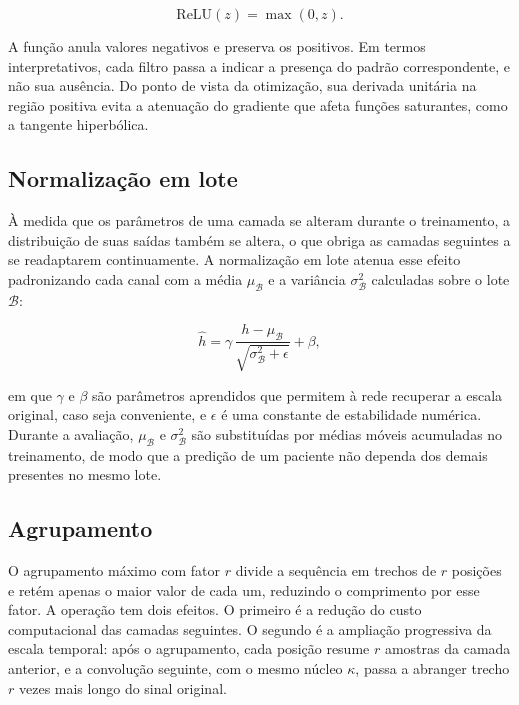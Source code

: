 \begin{equation}
	\mathrm{ReLU}(z) = \max(0, z).
	\label{eq:relu}
\end{equation}

A função anula valores negativos e preserva os positivos. Em termos
interpretativos, cada filtro passa a indicar a presença do padrão
correspondente, e não sua ausência. Do ponto de vista da otimização, sua
derivada unitária na região positiva evita a atenuação do gradiente que
afeta funções saturantes, como a tangente hiperbólica.

\subsection{Normalização em lote}
\label{subsec:fund-batchnorm}

À medida que os parâmetros de uma camada se alteram durante o treinamento, a
distribuição de suas saídas também se altera, o que obriga as camadas
seguintes a se readaptarem continuamente. A normalização em lote
\cite{ioffe2015batch} atenua esse efeito padronizando cada canal com a
média $\mu_{\mathcal{B}}$ e a variância $\sigma^{2}_{\mathcal{B}}$
calculadas sobre o lote $\mathcal{B}$:

\begin{equation}
	\hat{h} = \gamma \, \frac{h - \mu_{\mathcal{B}}}
	{\sqrt{\sigma^{2}_{\mathcal{B}} + \epsilon}} + \beta,
	\label{eq:batchnorm}
\end{equation}

\noindent
em que $\gamma$ e $\beta$ são parâmetros aprendidos que permitem à rede
recuperar a escala original, caso seja conveniente, e $\epsilon$ é uma
constante de estabilidade numérica. Durante a avaliação, $\mu_{\mathcal{B}}$
e $\sigma^{2}_{\mathcal{B}}$ são substituídas por médias móveis acumuladas no
treinamento, de modo que a predição de um paciente não dependa dos demais
presentes no mesmo lote.

\subsection{Agrupamento}
\label{subsec:fund-pooling}

O agrupamento máximo com fator $r$ divide a sequência em trechos de $r$
posições e retém apenas o maior valor de cada um, reduzindo o comprimento por
esse fator. A operação tem dois efeitos. O primeiro é a redução do custo
computacional das camadas seguintes. O segundo é a ampliação progressiva da
escala temporal: após o agrupamento, cada posição resume $r$ amostras da
camada anterior, e a convolução seguinte, com o mesmo núcleo $\kappa$, passa
a abranger trecho $r$ vezes mais longo do sinal original.

